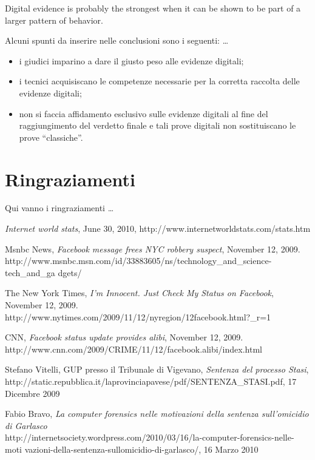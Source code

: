 \documentclass[runningheads,english]{llncs}
\begin{document}
{Digital evidence is probably the strongest when it can be shown to be part of a
larger pattern of behavior.

\noindent Alcuni spunti da inserire nelle conclusioni sono i seguenti: \dots
\begin{itemize}
\item i giudici imparino a dare il giusto peso alle evidenze digitali;
\item i tecnici acquisiscano le competenze necessarie per la corretta raccolta
delle evidenze digitali;
\item non si faccia affidamento esclusivo sulle evidenze digitali al fine del
raggiungimento del verdetto finale e tali prove digitali non sostituiscano le
prove ``classiche''.
\end{itemize}




\section*{Ringraziamenti}
\noindent Qui vanno i ringraziamenti \dots \\

\begin{thebibliography}{1}

\emph{Internet world stats}, June 30, 2010,
http://www.internetworldstats.com/stats.htm 

Msnbc News, \emph{Facebook message frees NYC robbery suspect}, November 12,
2009.
\\http://www.msnbc.msn.com/id/33883605/ns/technology\_and\_science-tech\_and\_ga
dgets/

The New York Times, \emph{I'm Innocent. Just Check My Status on Facebook},
November 12, 2009.
\\http://www.nytimes.com/2009/11/12/nyregion/12facebook.html?\_r=1 

CNN, \emph{Facebook status update provides alibi}, November 12, 2009.
\\http://www.cnn.com/2009/CRIME/11/12/facebook.alibi/index.html 

Stefano Vitelli, GUP presso il Tribunale di Vigevano, \emph{Sentenza del
processo Stasi},
http://static.repubblica.it/laprovinciapavese/pdf/SENTENZA\_STASI.pdf, 17
Dicembre 2009

Fabio Bravo, \emph{La computer forensics nelle motivazioni della sentenza
sull'omicidio di Garlasco}\\
http://internetsociety.wordpress.com/2010/03/16/la-computer-forensics-nelle-moti
vazioni-della-sentenza-sullomicidio-di-garlasco/, 16 Marzo 2010


\end{thebibliography}}
\end{document}
